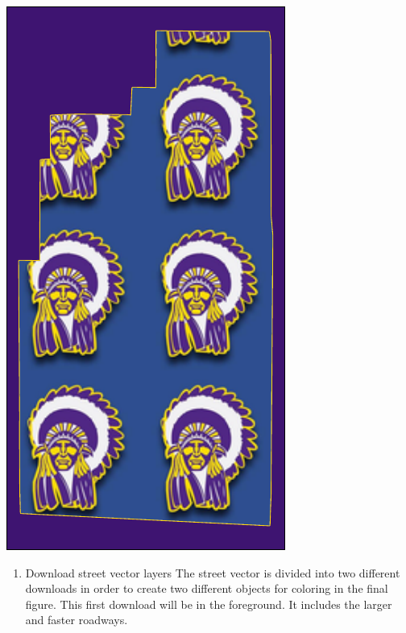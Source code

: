 \documentclass[
  paper=a4,
  ,captions=tableheading
]{scrartcl}
\providecommand{\tightlist}{%
  \setlength{\itemsep}{0pt}\setlength{\parskip}{0pt}}
\begin{document}
\includegraphics{Haskell_files/figure-latex/unnamed-chunk-17-1.pdf}

\begin{enumerate}
\def\labelenumi{\arabic{enumi}.}
\setcounter{enumi}{1}
\tightlist
\item
  Download street vector layers The street vector is divided into two
  different downloads in order to create two different objects for
  coloring in the final figure. This first download will be in the
  foreground. It includes the larger and faster roadways.
\end{enumerate}
\end{document}
